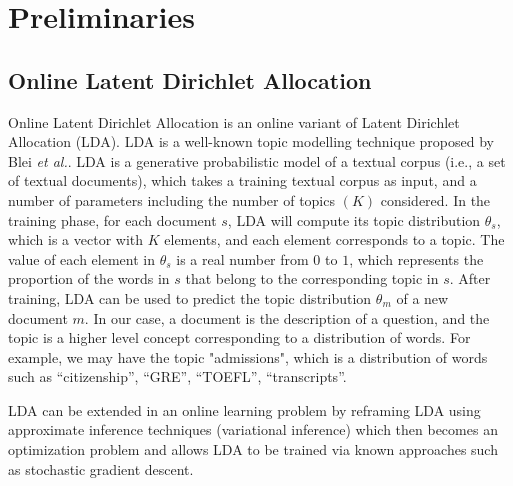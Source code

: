 \documentclass[journal,12pt,onecolumn,draftclsnofoot,]{IEEEtran}
\begin{document}
\section{Preliminaries}




\subsection{Online Latent Dirichlet Allocation}

Online Latent Dirichlet Allocation is an online variant of Latent Dirichlet Allocation (LDA). LDA is a well-known topic modelling technique proposed by Blei \emph{et al.}\cite{lda}. LDA is a generative probabilistic model of a textual corpus (i.e., a set of textual documents), which takes a training textual corpus as input, and a number of parameters including the number of topics $(K)$ considered. In the training phase, for each document $s$, LDA will compute its topic distribution $\theta_s$, which is a vector with $K$ elements, and each element corresponds to a topic. The value of each element in $\theta_s$ is a real number from $0$ to $1$, which represents the proportion of the words in $s$ that belong to the corresponding topic in $s$. After training, LDA can be used to predict the topic distribution $\theta_m$ of a new document $m$. In our case, a document is the description of a question, and the topic is a higher level concept corresponding to a distribution of words. For example, we may have the topic "admissions", which is a distribution of words such as ``citizenship'', ``GRE'', ``TOEFL'', ``transcripts''. 

LDA can be extended in an online learning problem by reframing LDA using approximate inference techniques (variational inference) which then becomes an optimization problem and allows LDA to be trained via known approaches such as stochastic gradient descent\cite{onlinelda}. %

\end{document}
